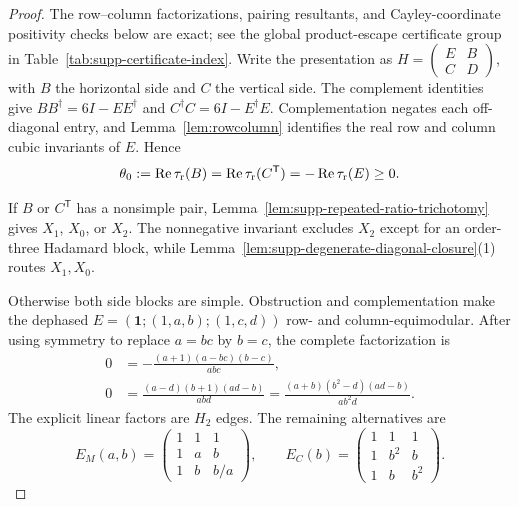 \documentclass[aps,prx,reprint,nofootinbib,twoside,superscriptaddress,longbibliography,floatfix]{revtex4-2}
\theoremstyle{definition}
\newcommand{\C}{\mathbb C}
\newcommand{\RePart}{\operatorname{Re}}
\begin{document}
\begin{proof}
The row--column factorizations, pairing resultants, and Cayley-coordinate positivity checks below are exact; see the global product-escape certificate group in Table~\ref{tab:supp-certificate-index}.
{Write the presentation as $H=\left(\begin{smallmatrix}E&B\\C&D\end{smallmatrix}\right)$, with $B$ the horizontal side and $C$ the vertical side.  The complement identities give $BB^\dagger=6I-EE^\dagger$ and $C^\dagger C=6I-E^\dagger E$.  Complementation negates each off-diagonal entry, and Lemma~\ref{lem:rowcolumn} identifies the real row and column cubic invariants of $E$. Hence}
\begin{equation}
{\theta_0:=\RePart\tau_{\rm r}(B)
=\RePart\tau_{\rm r}(C^{\mathsf T})
=-\RePart\tau_{\rm r}(E)\ge0.}
\label{eq:supp-two-sided-common-invariant}
\end{equation}

{If $B$ or $C^{\mathsf T}$ has a nonsimple pair, Lemma~\ref{lem:supp-repeated-ratio-trichotomy} gives $X_1$, $X_0$, or $X_2$.  The nonnegative invariant excludes $X_2$ except for an order-three Hadamard block, while Lemma~\ref{lem:supp-degenerate-diagonal-closure}(1) routes $X_1,X_0$.}

{Otherwise both side blocks are simple.  Obstruction and complementation make the dephased $E=(\mathbf1;(1,a,b);(1,c,d))$ row- and column-equimodular.  After using symmetry to replace $a=bc$ by $b=c$, the complete factorization is}
\begin{align}
{0}&{=-\frac{(a+1)(a-bc)(b-c)}{abc},}
\label{eq:supp-biequimodular-first-split}\\
{0}&{=\frac{(a-d)(b+1)(ad-b)}{abd}
=\frac{(a+b)(b^2-d)(ad-b)}{ab^2d}.}
\label{eq:supp-biequimodular-second-split}
\end{align}
{The explicit linear factors are $H_2$ edges. The remaining alternatives are}
\begin{equation}
{E_M(a,b)=\begin{pmatrix}1&1&1\\1&a&b\\1&b&b/a\end{pmatrix},
\qquad
E_C(b)=\begin{pmatrix}1&1&1\\1&b^2&b\\1&b&b^2\end{pmatrix}.}
\label{eq:supp-biequimodular-two-forms}
\end{equation}


\end{proof}
\end{document}
